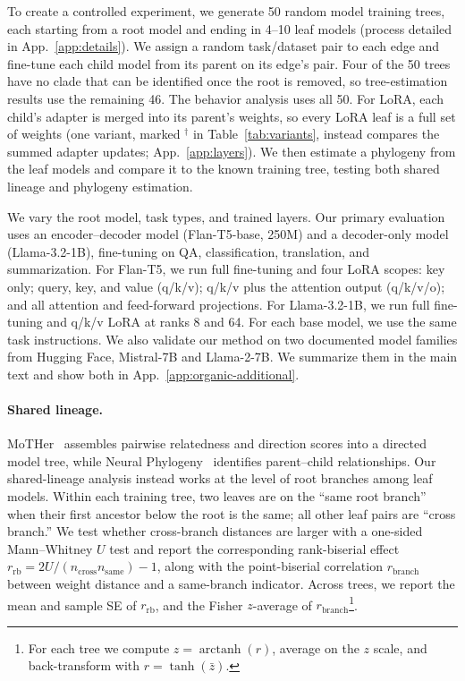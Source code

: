 \documentclass{article}
\theoremstyle{definition}
\theoremstyle{plain}
\begin{document}
To create a controlled experiment, we generate 50 random model training trees, each starting from a root
model and ending in 4--10 leaf models (process detailed in App.~\ref{app:details}). We assign a random task/dataset pair to each edge and fine-tune each child model from its parent on its edge's pair. Four of the 50 trees have no clade that can be identified once the root is removed, so tree-estimation results use the remaining 46. The behavior analysis uses all 50. For LoRA, each child's adapter is merged into its parent's weights, so every LoRA leaf is a full set of weights (one variant, marked $^\dagger$ in Table~\ref{tab:variants}, instead compares the summed adapter updates; App.~\ref{app:layers}). We then estimate a phylogeny from the leaf models and compare it to the known training tree, testing both shared
lineage and phylogeny estimation.

We vary the root model, task types, and trained layers. Our primary evaluation uses an
encoder--decoder model (Flan-T5-base, 250M) and a decoder-only model (Llama-3.2-1B), fine-tuning on
QA, classification, translation, and summarization. For Flan-T5, we run full fine-tuning and four LoRA \citep{hu2022lora}
scopes: key only; query, key, and value (q/k/v); q/k/v plus the attention output (q/k/v/o); and all attention and feed-forward projections.
For Llama-3.2-1B, we run full fine-tuning and q/k/v LoRA at ranks 8 and 64. For each base
model, we use the same task instructions. We also
validate our method on two documented model families from Hugging Face, Mistral-7B and Llama-2-7B. We
summarize them in the main text and show both in App.~\ref{app:organic-additional}.

\paragraph{Shared lineage.}
MoTHer~\citep{horwitz2025mother} assembles pairwise relatedness and direction scores into a directed
model tree, while Neural Phylogeny~\citep{yu2025neural} identifies parent--child relationships. Our
shared-lineage analysis instead works at the level of root branches among leaf models. Within each
training tree, two leaves are on the ``same root branch'' when their first ancestor below the root is
the same; all other leaf pairs are ``cross branch.'' We test whether cross-branch distances
are larger with a one-sided Mann--Whitney $U$ test and report the corresponding rank-biserial effect
$r_{\mathrm{rb}}=2U/(n_{\mathrm{cross}}n_{\mathrm{same}})-1$, along with the point-biserial correlation $r_{\mathrm{branch}}$ between weight distance and a same-branch indicator. Across trees, we report the mean and
sample SE of $r_{\mathrm{rb}}$, and the Fisher $z$-average of $r_{\mathrm{branch}}$\footnote{For each tree we
compute $z=\operatorname{arctanh}(r)$, average on the $z$ scale, and back-transform with
$r=\tanh(\bar z)$.}.
\end{document}
